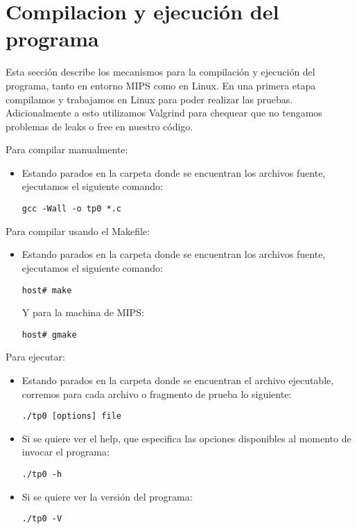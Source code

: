 \documentclass[a4paper]{article}
\begin{document}
\pagebreak

\section{Compilacion y ejecución del programa}
Esta sección describe  los mecanismos para la compilación y ejecución del programa, tanto en entorno MIPS como en Linux.
		   En una primera etapa compilamos y trabajamos en Linux para poder realizar las pruebas. 	Adicionalmente a esto utilizamos Valgrind para chequear que no tengamos problemas de leaks o free en nuestro código.\newline

Para compilar manualmente:
\begin{itemize}
\item Estando parados en la carpeta donde se encuentran los archivos fuente, ejecutamos el siguiente comando:
\begin{verbatim}
gcc -Wall -o tp0 *.c
\end{verbatim}
\end{itemize}

Para compilar usando el Makefile:
\begin{itemize}
\item Estando parados en la carpeta donde se encuentran los archivos fuente, ejecutamos el siguiente comando:
\begin{verbatim}
host# make
\end{verbatim}
Y para la machina de MIPS:
\begin{verbatim}
host# gmake
\end{verbatim}
\end{itemize}

Para ejecutar:
\begin{itemize}
\item Estando parados en la carpeta donde se encuentran el archivo ejecutable, corremos para cada archivo o fragmento de prueba lo siguiente:
\begin{verbatim}
./tp0 [options] file
\end{verbatim}
\item Si se quiere ver el help, que especifica las opciones disponibles al momento de invocar el programa:
\begin{verbatim}
./tp0 -h
\end{verbatim}
\item Si se quiere ver la versión del programa:
\begin{verbatim}
./tp0 -V
\end{verbatim}
\end{itemize}
\pagebreak
\end{document}
